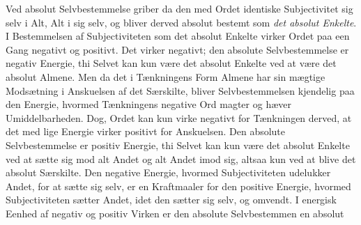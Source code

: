\documentclass[12pt]{book}
\begin{document}
Ved absolut Selvbestemmelse griber da den med Ordet identiske Subjectivitet sig selv i Alt, Alt i sig selv, og bliver derved absolut bestemt som \emph{det absolut Enkelte}. I Bestemmelsen af Subjectiviteten som det absolut Enkelte virker Ordet paa een Gang negativt og positivt. Det virker negativt; den absolute Selvbestemmelse er negativ Energie, thi Selvet kan kun være det absolut Enkelte ved at være det absolut Almene. Men da det i Tænkningens Form Almene har sin mægtige Modsætning i Anskuelsen af det Særskilte, bliver Selvbestemmelsen kjendelig paa den Energie, hvormed Tænkningens negative Ord magter og hæver Umiddelbarheden. Dog, Ordet kan kun virke negativt for Tænkningen derved, at det med lige Energie virker positivt for Anskuelsen. Den absolute Selvbestemmelse er positiv Energie, thi Selvet kan kun være det absolut Enkelte ved at sætte sig mod alt Andet og alt Andet imod sig, altsaa kun ved at blive det absolut Særskilte. Den negative Energie, hvormed Subjectiviteten udelukker Andet, for at sætte sig selv, er en Kraftmaaler for den positive Energie, hvormed Subjectiviteten sætter Andet, idet den sætter sig selv, og omvendt. I energisk Eenhed af negativ og positiv Virken er den absolute Selvbestemmen en absolut
\end{document}
